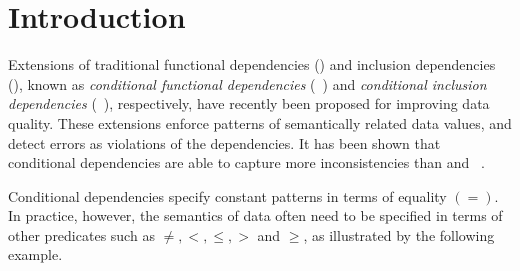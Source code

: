 


\section{Introduction}
\label{sec-intro}



Extensions of traditional functional dependencies (\FDs) and inclusion dependencies
(\INDs), known as {\em conditional functional dependencies} (\CFDs~\cite{CFDs})
and {\em conditional inclusion dependencies} (\CINDs~\cite{tcs-CINDs}),
respectively, have recently been proposed for improving data quality.
These extensions enforce patterns of semantically
related data values, and
detect errors as violations of the dependencies.
It has been shown that conditional dependencies are able to capture more inconsistencies
than \FDs and \INDs~\cite{CFDs,repair,CINDs,tcs-CINDs,book-Fan}.

Conditional dependencies specify constant patterns in terms of
equality $(=)$. In practice, however, the semantics of data often
need to be specified in terms of other predicates such as
$\ne, <, \le, >$ and $\ge$, as illustrated by the following example.




